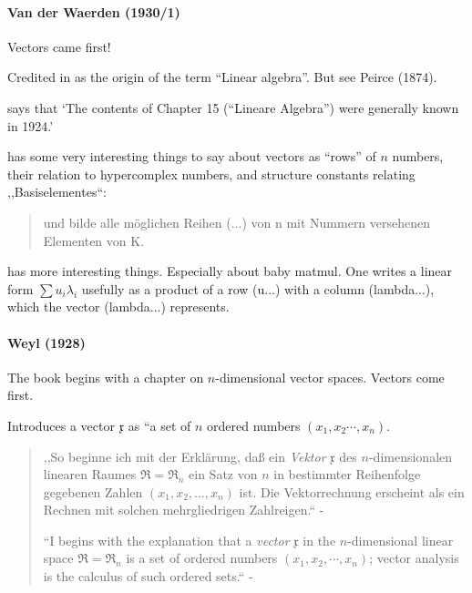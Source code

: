 \paragraph{Van der Waerden (1930/1)~\cite{vdWaerden1930,vdWaerden1931}}

Vectors came first!


Credited in \cite{Kleiner2007} as the origin of the term ``Linear algebra''. But
see Peirce (1874).

\cite[p. 36]{vdWaerden1975} says that `The contents of Chapter 15 (``Lineare Algebra'') were generally
known in 1924.'


\cite[\S 10, pp. 43-44]{vdWaerden1930} has some very interesting things to say
about vectors as ``rows'' of $n$ numbers, their relation to hypercomplex numbers,
and structure constants relating ,,Basiselementes``:

\begin{quote}
und bilde alle möglichen Reihen (...) von n
mit Nummern versehenen Elementen von K.


\end{quote}

\cite[\S 104, pp. 110. ff.]{vdWaerden1931} has more interesting things.
Especially about baby matmul.
One writes a linear form $\sum u_i \lambda_i$ usefully as a product of a row (u...) with a column (lambda...), which the vector (lambda...) represents.



\paragraph{Weyl (1928)~\cite{Weyl1928,Weyl1931}}

The book begins with a chapter on $n$-dimensional vector spaces.
Vectors come first.

Introduces a vector $\mathfrak x$ as ``a set of $n$ ordered numbers $(x_1, x_2 \cdots, x_n)$.

\begin{quote}
,,So beginne ich mit der Erklärung, daß ein \textit{Vektor} $\mathfrak x$ des $n$-dimensionalen linearen Raumes
$\mathfrak R = \mathfrak R_n$
ein Satz von $n$ in bestimmter Reihenfolge gegebenen Zahlen $(x_1, x_2, \dots, x_n)$
ist. Die Vektorrechnung erscheint als ein Rechnen mit solchen mehrgliedrigen
Zahlreigen.`` - \cite[p. 4]{Weyl1928}

``I begins with the explanation that a \textit{vector} $\mathfrak x$ in the $n$-dimensional
linear space $\mathfrak R = \mathfrak R_n$ is a set of ordered numbers $(x_1, x_2, \cdots, x_n)$;
vector analysis is the calculus of such ordered sets.`` - \cite[p. 1]{Weyl1931}
\end{quote}

